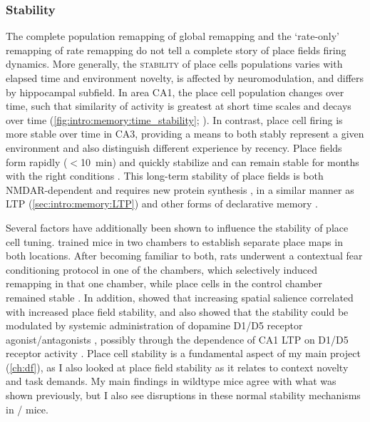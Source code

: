 \subsubsection{Stability}
\label{sec:intro:memory:stability}
The complete population remapping of global remapping and the `rate-only' remapping of rate remapping do not tell a complete story of place fields firing dynamics.
More generally, the \textsc{stability} of place cells populations varies with elapsed time and environment novelty, is affected by neuromodulation, and differs by hippocampal subfield.
In area CA1, the place cell population changes over time, such that similarity of activity is greatest at short time scales and decays over time (\autoref{fig:intro:memory:time_stability}; \citealp{Mankin2012}).
In contrast, place cell firing is more stable over time in CA3, providing a means to both stably represent a given environment and also distinguish different experience by recency.
Place fields form rapidly ($<$10~min) and quickly stabilize \citep{Frank2004} and can remain stable for months with the right conditions \citep{Thompson1990, Lever2002a, Ziv2013}.
This long-term stability of place fields is both \ac{NMDAR}-dependent \citep{McHugh1996, Kentros1998} and requires new protein synthesis \citep{Agnihotri2004}, in a similar manner as LTP (\autoref{sec:intro:memory:LTP}) and other forms of declarative memory \citep{Hernandez2008}.

Several factors have additionally been shown to influence the stability of place cell tuning.
\citeauthor{Moita2004} trained mice in two chambers to establish separate place maps in both locations.
After becoming familiar to both, rats underwent a contextual fear conditioning protocol in one of the chambers, which selectively induced remapping in that one chamber, while place cells in the control chamber remained stable \citep{Moita2004}.
In addition, \citeauthor{Kentros2004} showed that increasing spatial salience correlated with increased place field stability, and also showed that the stability could be modulated by systemic administration of dopamine D1/D5 receptor agonist/antagonists \citep{Kentros2004}, possibly through the dependence of CA1 LTP on D1/D5 receptor activity \citep{Huang1995}.
Place cell stability is a fundamental aspect of my main project (\autoref{ch:df}), as I also looked at place field stability as it relates to context novelty and task demands.
My main findings in wildtype mice agree with what was shown previously, but I also see disruptions in these normal stability mechanisms in \df/ mice.

